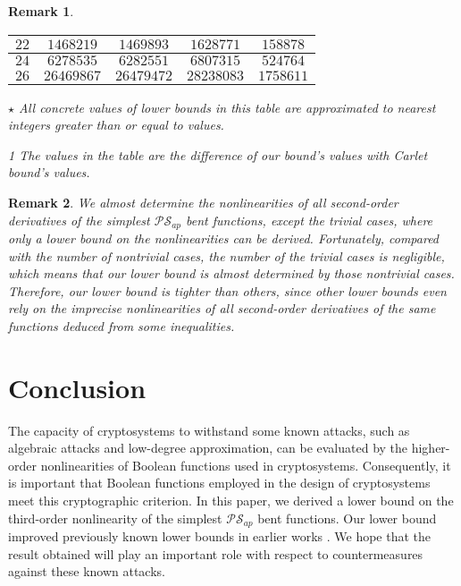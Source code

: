 \documentclass{article}
\newcommand{\0}{\textbf{0}}
\newcommand{\1}{\textbf{1}}
\theoremstyle{plain}
\newtheorem{remark}{Remark}
\begin{document}
\begin{remark}
\begin{table}
\begin{threeparttable}
\begin{tabular}{|c|c|c|c|c|}
                    $22 $ &  $ 1468219     $       & $ 1469893  $     & $ 1628771  $     & $  158878  $ \\  \hline
                    $24 $ &  $ 6278535     $       & $ 6282551  $     & $ 6807315  $     & $  524764  $ \\  \hline
                    $26 $ &  $ 26469867    $       & $ 26479472 $     & $ 28238083 $     & $  1758611 $ \\  \hline
                \end{tabular}
                \begin{tablenotes}
                    \footnotesize
                    \item[$\star$] All concrete values of lower bounds in this table are approximated to nearest  integers greater than or equal to values.
                    \item[1] The values in the table are the difference of our bound's values with  Carlet bound's values.
                \end{tablenotes}
            \end{threeparttable}
            \label{table:MyTableLabel}
        \end{table}
    \end{remark}

    \begin{remark}
        We almost determine the nonlinearities of all second-order derivatives of the simplest $\mathcal{PS}_{ap}$ bent functions, except the trivial cases, where only a lower bound on the nonlinearities can be derived.
        Fortunately, compared with the number of nontrivial cases, the number of the trivial cases is negligible, 
        which means that our lower bound is almost determined by those nontrivial cases. 
        Therefore, our lower bound is tighter than others, since other lower bounds even rely on the imprecise nonlinearities of all second-order derivatives of the same functions deduced from some inequalities. 
    \end{remark}
    
\section{Conclusion}
    The capacity of cryptosystems to withstand some known attacks, such as algebraic attacks and low-degree approximation, can be evaluated by the higher-order nonlinearities of Boolean functions used in cryptosystems. 
    Consequently, it is important that Boolean functions employed in the design of cryptosystems meet this cryptographic criterion.
    In this paper, we derived a lower bound on the third-order nonlinearity of the simplest $\mathcal{PS}_{ap}$ bent functions.
    Our lower bound improved previously known lower bounds in earlier works \cite{TangCT2013NL_2bent,Carlet2011NL_Profile_Dillon}.
    We hope that the result obtained will play an important role with respect to countermeasures against these known attacks.



\end{document}
